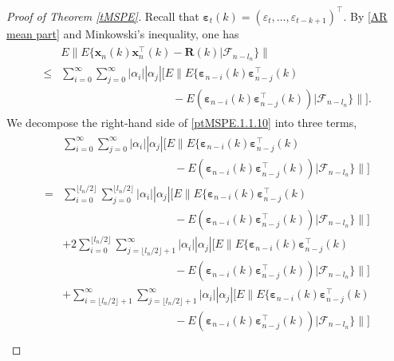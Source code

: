 \documentclass[ejsv2]{imsart}
\theoremstyle{plain}
\theoremstyle{definition}
\theoremstyle{remark}
\begin{document}
\begin{proof}[Proof of Theorem \ref{tMSPE}]
{Recall that $\bm{\varepsilon}_t(k)=(\varepsilon_t,\ldots,\varepsilon_{t-k+1})^\top$. By \eqref{AR mean part} and Minkowski's inequality, one has
\begin{align}\label{ptMSPE.1.1.10}
\begin{split}
     & E\lVert E\{\mathbf{x}_n(k)\mathbf{x}_n^\top(k)-\mathbf{R}(k)|\mathcal{F}_{n-l_n}\}\rVert \\
     \leq& \sum_{i=0}^{\infty}\sum_{j=0}^{\infty}|\alpha_i||\alpha_j|[E\lVert E\{\bm{\varepsilon}_{n-i}(k)\bm{\varepsilon}_{n-j}^\top(k)\\
     &\hspace{10em}-E(\bm{\varepsilon}_{n-i}(k)\bm{\varepsilon}_{n-j}^\top(k))|\mathcal{F}_{n-l_n}\}\rVert].
\end{split}
\end{align}
We decompose the right-hand side of \eqref{ptMSPE.1.1.10} into three terms,
\begin{align}\label{ptMSPE.1.1.11}
\begin{split}
     & \sum_{i=0}^{\infty}\sum_{j=0}^{\infty}|\alpha_i||\alpha_j|[E\lVert E\{\bm{\varepsilon}_{n-i}(k)\bm{\varepsilon}_{n-j}^\top(k)\\
     &\hspace{10em}-E(\bm{\varepsilon}_{n-i}(k)\bm{\varepsilon}_{n-j}^\top(k))|\mathcal{F}_{n-l_n}\}\rVert] \\
     =& \sum_{i=0}^{\lfloor l_n/2\rfloor}\sum_{j=0}^{\lfloor l_n/2\rfloor}|\alpha_i||\alpha_j|[E\lVert E\{\bm{\varepsilon}_{n-i}(k)\bm{\varepsilon}_{n-j}^\top(k)\\
     &\hspace{10em}-E(\bm{\varepsilon}_{n-i}(k)\bm{\varepsilon}_{n-j}^\top(k))|\mathcal{F}_{n-l_n}\}\rVert]\\
     &+2\sum_{i=0}^{\lfloor l_n/2\rfloor}\sum_{j=\lfloor l_n/2\rfloor+1}^{\infty}|\alpha_i||\alpha_j|[E\lVert E\{\bm{\varepsilon}_{n-i}(k)\bm{\varepsilon}_{n-j}^\top(k)\\
     &\hspace{10em}-E(\bm{\varepsilon}_{n-i}(k)\bm{\varepsilon}_{n-j}^\top(k))|\mathcal{F}_{n-l_n}\}\rVert]\\
     &+\sum_{i=\lfloor l_n/2\rfloor+1}^{\infty}\sum_{j=\lfloor l_n/2\rfloor+1}^{\infty}|\alpha_i||\alpha_j|[E\lVert E\{\bm{\varepsilon}_{n-i}(k)\bm{\varepsilon}_{n-j}^\top(k)\\
     &\hspace{10em}-E(\bm{\varepsilon}_{n-i}(k)\bm{\varepsilon}_{n-j}^\top(k))|\mathcal{F}_{n-l_n}\}\rVert]\\

\end{split}
\end{align}}
\end{proof}
\end{document}

